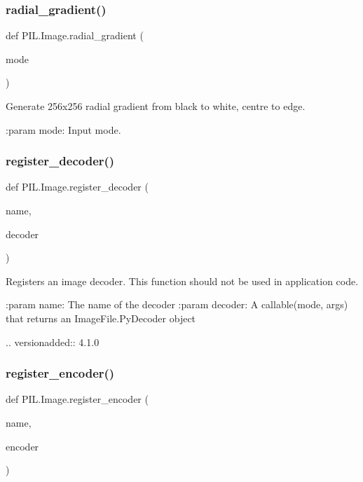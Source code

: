 \subsubsection{\texorpdfstring{radial\+\_\+gradient()}{radial\_gradient()}}
{\footnotesize\ttfamily def P\+I\+L.\+Image.\+radial\+\_\+gradient (\begin{DoxyParamCaption}\item[{}]{mode }\end{DoxyParamCaption})}

\begin{DoxyVerb}Generate 256x256 radial gradient from black to white, centre to edge.

:param mode: Input mode.
\end{DoxyVerb}
 \mbox{\label{namespacePIL_1_1Image_aa3e31daf60b9a8e36021cfc6fd7712e8}} 
\subsubsection{\texorpdfstring{register\+\_\+decoder()}{register\_decoder()}}
{\footnotesize\ttfamily def P\+I\+L.\+Image.\+register\+\_\+decoder (\begin{DoxyParamCaption}\item[{}]{name,  }\item[{}]{decoder }\end{DoxyParamCaption})}

\begin{DoxyVerb}Registers an image decoder.  This function should not be
used in application code.

:param name: The name of the decoder
:param decoder: A callable(mode, args) that returns an
                ImageFile.PyDecoder object

.. versionadded:: 4.1.0
\end{DoxyVerb}
 \mbox{\label{namespacePIL_1_1Image_a644b41f5ea9e6a89d408e2f85937a012}} 
\subsubsection{\texorpdfstring{register\+\_\+encoder()}{register\_encoder()}}
{\footnotesize\ttfamily def P\+I\+L.\+Image.\+register\+\_\+encoder (\begin{DoxyParamCaption}\item[{}]{name,  }\item[{}]{encoder }\end{DoxyParamCaption})}

